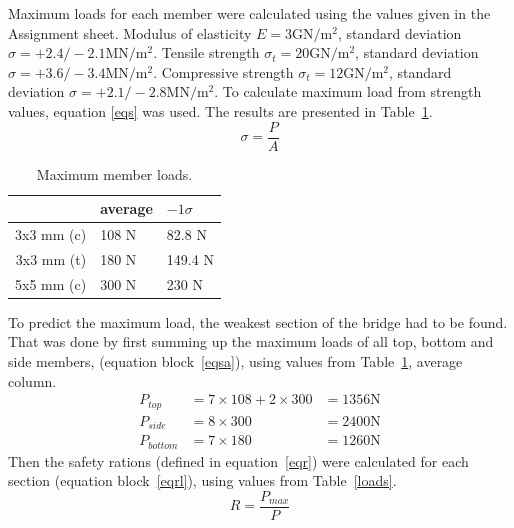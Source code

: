 \documentclass[12pt]{article}
\begin{document}
		Maximum loads for each member were calculated using the values given in the Assignment sheet. Modulus of elasticity $E=3\mathrm{GN}/\mathrm{m}^2$, standard deviation $\sigma=+2.4/-2.1\mathrm{MN}/\mathrm{m}^2$. Tensile strength $\sigma_t=20\mathrm{GN}/\mathrm{m}^2$,  standard deviation $\sigma=+3.6/-3.4\mathrm{MN}/\mathrm{m}^2$. Compressive strength $\sigma_t=12\mathrm{GN}/\mathrm{m}^2$,  standard deviation $\sigma=+2.1/-2.8\mathrm{MN}/\mathrm{m}^2$. To calculate maximum load from strength values, equation \ref{eqs} was used. The results are presented in Table~\ref{maxloads}.
		\begin{equation}
			\sigma=\frac{P}{A}
			\label{eqs}
		\end{equation}
		\begin{table}[h!]
			\caption{Maximum member loads.}
			\begin{center}
			\begin{tabular}{ | r | l | l | }
				\hline
				& average & $-1\sigma$ \\ \hline
				3x3 mm (c) & 108 N & 82.8 N \\ \hline
				3x3 mm (t) & 180 N & 149.4 N \\ \hline
				5x5 mm (c) & 300 N & 230 N \\ \hline
			\end{tabular}
			\end{center}
			\label{maxloads}
		\end{table}
		To predict the maximum load, the weakest section of the bridge had to be found. That was done by first summing up the maximum loads of all top, bottom and side members, (equation block~\ref{eqsa}), using values from Table~\ref{maxloads}, average column.
		\begin{subequations}
			\begin{align}
				P_{top}&=7\times108+2\times300
				&=1356\mathrm{N}\\
				P_{side}&=8\times300
				&=2400\mathrm{N}\\
				P_{bottom}&=7\times180
				&=1260\mathrm{N}
			\end{align}
			\label{eqsa}
		\end{subequations}
		Then the safety rations (defined in equation~\ref{eqr}) were calculated for each section (equation block~\ref{eqrl}), using values from Table~\ref{loads}.
		\begin{equation}
			R=\frac{P_{max}}{P}
			\label{eqr}
		\end{equation}
\end{document}

